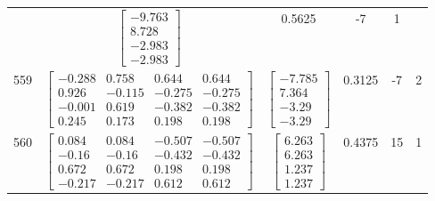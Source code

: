 \documentclass[a4paper,12pt]{article}
\begin{document}
\begin{tabular}{c c c c c c}
&
$\begin{bmatrix} -9.763 \\ 8.728 \\ -2.983 \\ -2.983 \end{bmatrix}$
&
0.5625
&
-7
&
1
\\
559
&
$\begin{bmatrix} -0.288 & 0.758 & 0.644 & 0.644 \\ 0.926 & -0.115 & -0.275 & -0.275 \\ -0.001 & 0.619 & -0.382 & -0.382 \\ 0.245 & 0.173 & 0.198 & 0.198 \end{bmatrix}$
&
$\begin{bmatrix} -7.785 \\ 7.364 \\ -3.29 \\ -3.29 \end{bmatrix}$
&
0.3125
&
-7
&
2
\\
560
&
$\begin{bmatrix} 0.084 & 0.084 & -0.507 & -0.507 \\ -0.16 & -0.16 & -0.432 & -0.432 \\ 0.672 & 0.672 & 0.198 & 0.198 \\ -0.217 & -0.217 & 0.612 & 0.612 \end{bmatrix}$
&
$\begin{bmatrix} 6.263 \\ 6.263 \\ 1.237 \\ 1.237 \end{bmatrix}$
&
0.4375
&
15
&
1
\\
\end{tabular} \egroup \newpage
\end{document}
